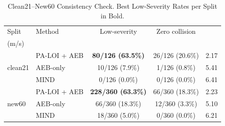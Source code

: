 \begin{table}[t]
\caption{Clean21--New60 Consistency Check. Best Low-Severity Rates per Split in Bold.}
\label{tab:split-consistency}
\centering
\footnotesize
\setlength{\tabcolsep}{2.5pt}
\begin{tabular}{llccc}
\toprule
Split & Method & Low-severity & Zero collision & \makecell{Mean $v_{\mathrm{imp}}$\\(m/s)} \\
\midrule
\multirow{3}{*}{clean21} & PA-LOI + AEB & \textbf{80/126 (63.5\%)} & 26/126 (20.6\%) & 2.17 \\
 & AEB-only & 10/126 (7.9\%) & 1/126 (0.8\%) & 5.41 \\
 & MIND & 0/126 (0.0\%) & 0/126 (0.0\%) & 6.41 \\
\midrule
\multirow{3}{*}{new60} & PA-LOI + AEB & \textbf{228/360 (63.3\%)} & 66/360 (18.3\%) & 2.23 \\
 & AEB-only & 66/360 (18.3\%) & 12/360 (3.3\%) & 5.10 \\
 & MIND & 18/360 (5.0\%) & 0/360 (0.0\%) & 6.21 \\
\bottomrule
\end{tabular}
\end{table}
